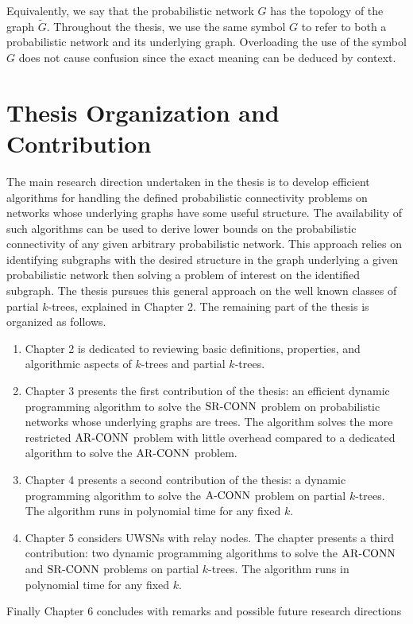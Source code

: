 Equivalently, we say that the probabilistic network $G$ has the topology of the graph $\tilde{G}$. Throughout the thesis, we use the same symbol $G$ to refer to both a probabilistic network and its underlying graph. Overloading the use of the symbol $G$ does not cause confusion since the exact meaning can be deduced by context.
\section{Thesis Organization and Contribution}
\label{sec:thc}

The main research direction undertaken in the thesis is to develop efficient algorithms for handling the defined probabilistic connectivity problems on networks whose underlying graphs have some useful structure. The availability of such algorithms can be used to derive lower bounds on the probabilistic connectivity of any given arbitrary probabilistic network. This approach relies on identifying subgraphs with the desired structure in the graph underlying a given probabilistic network then solving a problem of interest on the identified subgraph.
The thesis pursues this general approach on the well known classes of partial $k$-trees, explained in Chapter 2. The remaining part of the thesis is organized as follows.
\begin{enumerate}
\item Chapter 2 is dedicated to reviewing basic definitions, properties, and algorithmic aspects of $k$-trees and partial $k$-trees.

\item Chapter 3 presents the first contribution of the thesis: an efficient dynamic programming algorithm to solve the ${\mathrm {SR\mbox{-}CONN}}$ problem on probabilistic networks whose underlying graphs are trees. The algorithm solves the more restricted ${\mathrm {AR\mbox{-}CONN}}$ problem with little overhead compared to a dedicated algorithm to solve the ${\mathrm {AR\mbox{-}CONN}}$ problem.
\item Chapter 4 presents a second contribution of the thesis: a dynamic programming algorithm to solve the ${\mathrm {A\mbox{-}CONN}}$ problem on partial $k$-trees. The algorithm runs in polynomial time for any fixed $k$.
\item Chapter 5 considers UWSNs with relay nodes. The chapter presents a third contribution: two dynamic programming algorithms to solve the ${\mathrm {AR\mbox{-}CONN}}$ and ${\mathrm {SR\mbox{-}CONN}}$ problems on partial $k$-trees. The algorithm runs in polynomial time for any fixed $k$. 
\end{enumerate}
Finally Chapter 6 concludes with remarks and possible future research directions


